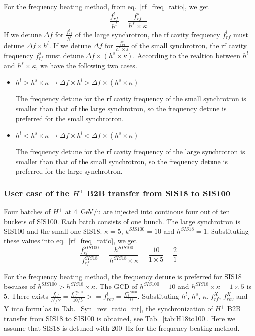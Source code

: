 For the frequency beating method, from eq.~\ref{rf_freq_ratio}, we get
\begin{equation}
\frac{f_{rf}^{l}}{h^l}= \frac{f_{rf}^{s}}{h^s \times \kappa} 
\end{equation}
If we detune $\Delta f$ for $\frac{f_{rf}^{l}}{h^l}$ of the large synchrotron, the rf cavity frequency $ f_{rf}^{l}$ must detune $\Delta f \times h^l$. If we detune $\Delta f$ for $\frac{f_{rf}^{s}}{h^s \times \kappa}$ of the small synchrotron, the rf cavity frequency $ f_{rf}^{s}$ must detune $\Delta f \times (h^s \times \kappa)$. According to the realtion between $h^l$ and $h^s \times \kappa$, we have the following two cases.
\begin{itemize}
	\item $h^l > h^s \times \kappa \rightarrow \Delta f \times h^l > \Delta f \times (h^s \times \kappa)$ 

The frequency detune for the rf cavity frequency of the small synchrotron is smaller than that of the large synchrotron, so the frequency detune is preferred for the small synchrotron.
	\item $h^l < h^s \times \kappa \rightarrow \Delta f \times h^l < \Delta f \times (h^s \times \kappa)$

The frequency detune for the rf cavity frequency of the large synchrotron is smaller than that of the small synchrotron, so the frequency detune is preferred for the large synchrotron.
\end{itemize}
\subsubsection{User case of the $H^{+}$ B2B transfer from SIS18 to SIS100}
Four batches of $H^{+}$ at \SI{4}{GeV/\atomicmassunit} are injected into continous four out of ten buckets of SIS100. Each batch consists of one bunch. The large synchrotron is SIS100 and the small one SIS18. $\kappa=5$, $h^{SIS100}=10$ and $h^{SIS18}=1$. Substituting these values into eq.~\ref{rf_freq_ratio}, we get
\begin{equation}
\frac{f_{rf}^{SIS100}}{f_{rf}^{SIS18}}= \frac {h^{SIS100}}{h^{SIS18} \times \kappa}= \frac{10}{1 \times 5}=\frac{2}{1}
\end{equation}

For the frequency beating method, the frequency detune is preferred for SIS18 becuase of $h^{SIS100} > h^{SIS18} \times \kappa$. The GCD of $h^{SIS100}=10$ and $h^{SIS18} \times \kappa=1\times 5$  is 5.
There exists $\frac{f_{rf}^{l}}{h^l/Y}=\frac{f_{rf}^{SIS100}}{10/5}>=f_{rev}^{l}=\frac{f_{rf}^{SIS100}}{10}$. Substituting $h^l$, $h^s$, $\kappa$, $f_{rf}^{X}$, $f_{rev}^{X}$ and Y into formulas in Tab.~\ref{Syn_rev_ratio_int}, the synchronization of $H^{+}$ B2B transfer from SIS18 to SIS100 is obtained, see Tab.~\ref{tab:H18to100}. Here we assume that SIS18 is detuned with \SI{200}{Hz} for the frequency beating method. 

